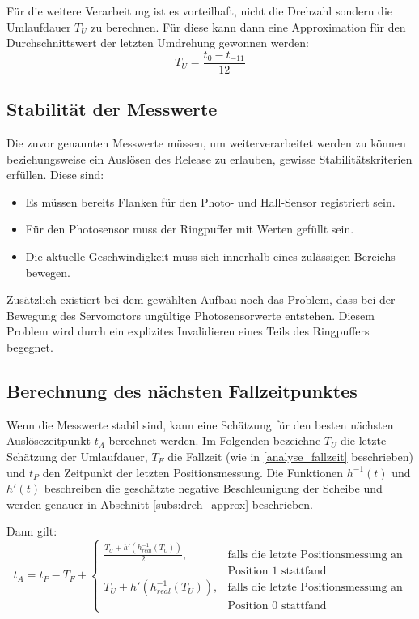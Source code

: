 Für die weitere Verarbeitung ist es vorteilhaft, nicht die Drehzahl sondern die Umlaufdauer $T_U$ zu berechnen.
Für diese kann dann eine Approximation für den Durchschnittswert der letzten Umdrehung gewonnen werden:
\begin{equation*}
T_U = \frac{t_0 - t_{-11}}{12}
\end{equation*}

\subsection{Stabilität der Messwerte}\label{design_stabilitaet}
Die zuvor genannten Messwerte müssen, um weiterverarbeitet werden zu können beziehungsweise ein Auslösen des Release zu erlauben, gewisse Stabilitätskriterien erfüllen.
Diese sind:
\begin{itemize}
	\item Es müssen bereits Flanken für den Photo- und Hall-Sensor registriert sein.
	\item Für den Photosensor muss der Ringpuffer mit Werten gefüllt sein.
	\item Die aktuelle Geschwindigkeit muss sich innerhalb eines zulässigen Bereichs bewegen.
\end{itemize}

Zusätzlich existiert bei dem gewählten Aufbau noch das Problem, dass bei der Bewegung des Servomotors ungültige Photosensorwerte entstehen.
Diesem Problem wird durch ein explizites Invalidieren eines Teils des Ringpuffers begegnet.

\subsection{Berechnung des nächsten Fallzeitpunktes}\label{design_zeitpunkt}
Wenn die Messwerte stabil sind, kann eine Schätzung für den besten nächsten Auslösezeitpunkt $t_A$ berechnet werden.
Im Folgenden bezeichne $T_U$ die letzte Schätzung der Umlaufdauer, $T_F$ die Fallzeit (wie in \cref{analyse_fallzeit} beschrieben) und $t_P$ den Zeitpunkt der letzten Positionsmessung.
Die Funktionen $h^{-1}(t)$ und $h'(t)$ beschreiben die geschätzte negative Beschleunigung der Scheibe und werden genauer in Abschnitt \ref{subs:dreh_approx} beschrieben.

Dann gilt:
\begin{equation*}
t_A = t_P - T_F +
\begin{cases}
	\frac{T_U + h'(h^{-1}_{real}(T_U))}{2} , & \text{falls die letzte Positionsmessung an}\\
	&  \text{Position 1 stattfand}\\
	T_U + h'(h^{-1}_{real}(T_U)), & \text{falls die letzte Positionsmessung an}\\
	&  \text{Position 0 stattfand}
\end{cases}
\end{equation*}

